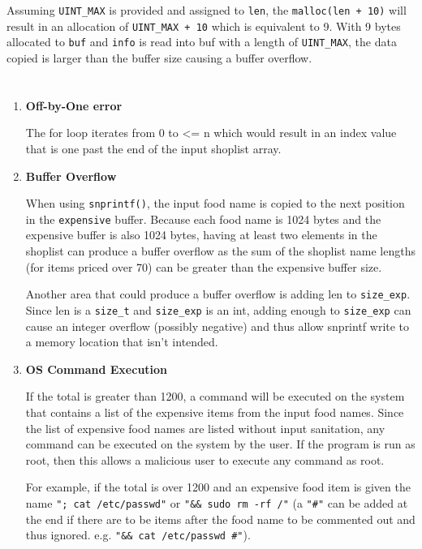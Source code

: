 \documentclass[12pt]{exam}
\begin{document}
Assuming \lstinline{UINT_MAX} is provided and assigned to \lstinline{len}, the
\lstinline{malloc(len + 10)} will result in an allocation of \lstinline{UINT_MAX + 10}
which is equivalent to 9.  With 9 bytes allocated to \lstinline{buf} and
\lstinline{info} is read into buf with a length of \lstinline{UINT_MAX}, the
data copied is larger than the buffer size causing a buffer overflow.

\section{}

\begin{enumerate}[listparindent=1.25em]
    \item \textbf{Off-by-One error}

          The for loop iterates from 0 to <= n which would result in an index
          value that is one past the end of the input shoplist array.

    \item \textbf{Buffer Overflow}

          When using \lstinline{snprintf()}, the input food name is copied to
          the next position in the \lstinline{expensive} buffer.  Because each
          food name is 1024 bytes and the expensive buffer is also 1024 bytes,
          having at least two elements in the shoplist can produce a buffer
          overflow as the sum of the shoplist name lengths (for items priced
          over 70) can be greater than the expensive buffer size.

          Another area that could produce a buffer overflow is adding len to
          \lstinline{size_exp}.  Since len is a \lstinline{size_t} and
          \lstinline{size_exp} is an int, adding enough to \lstinline{size_exp}
          can cause an integer overflow (possibly negative) and thus allow
          snprintf write to a memory location that isn't intended. 
    
    \item \textbf{OS Command Execution}
    
          If the total is greater than 1200, a command will be executed on the
          system that contains a list of the expensive items from the input food
          names.  Since the list of expensive food names are listed without
          input sanitation, any command can be executed on the system by the
          user.  If the program is run as root, then this allows a malicious
          user to execute any command as root.

          For example, if the total is over 1200 and an expensive food item is
          given the name \lstinline{"; cat /etc/passwd"} or 
          \lstinline{"&& sudo rm -rf /"} (a \lstinline{"#"} can be added at
          the end if there are to be items after the food name to be commented
          out and thus ignored.  e.g. \lstinline{"&& cat /etc/passwd #"}).
\end{enumerate}
\end{document}
